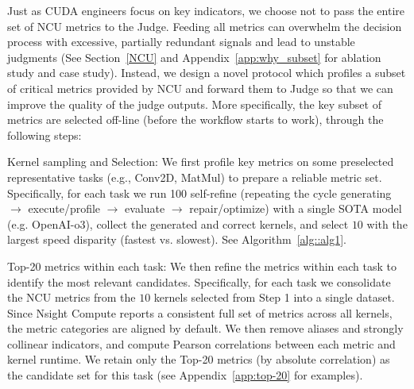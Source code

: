 Just as CUDA engineers focus on key indicators, we choose not to pass the entire set of NCU metrics to the Judge. Feeding all metrics can overwhelm the decision process with excessive, partially redundant signals and lead to unstable judgments (See Section~\ref{NCU} and Appendix~\ref {app:why_subset} for ablation study and case study). Instead, we design a novel protocol which profiles a subset of critical metrics provided by NCU and forward them to Judge so that we can improve the quality of the judge outputs. %
More specifically, the key subset of metrics are selected off-line (before the workflow starts to work), through the following steps: 


  {\sf Kernel sampling and Selection}: We first profile key metrics on some preselected representative tasks (e.g., Conv2D, MatMul) to prepare a reliable metric set. Specifically, for each task we run 100 self-refine (repeating the cycle generating $\to$ execute/profile $\to$ evaluate $\to$ repair/optimize) with a single SOTA model (e.g. OpenAI-o3), collect the generated and correct kernels, and select $10$ with the largest speed disparity (fastest vs. slowest). See Algorithm~\ref{alg::alg1}. 
 
\begin{algorithm}[H]
\caption{Step 1: Kernel Sampling and Selection}\label{alg::alg1}

\end{algorithm}


   {\sf Top-20 metrics within each task}: We then refine the metrics within each task to identify the most relevant candidates. Specifically, for each task we consolidate the NCU metrics from the $10$ kernels selected from Step 1 into a single dataset. Since Nsight Compute reports a consistent full set of metrics across all kernels, the metric categories are aligned by default. We then remove aliases and strongly collinear indicators, and compute Pearson correlations between each metric and kernel runtime. We retain only the Top-20 metrics (by absolute correlation) as the candidate set for this task (see Appendix~\ref{app:top-20}  for examples). 


